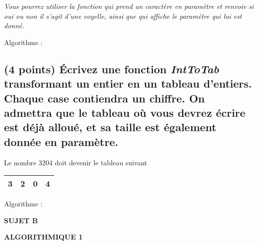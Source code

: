 \documentclass[11pt,a4paper]{article}
\newcommand{\TitreMatiere}{Algorithmique 1}
\begin{document}

\noindent \textit{Vous pourrez utiliser la fonction  qui prend un caractère en paramètre et renvoie si oui ou non il s'agit d'une voyelle, ainsi que  qui affiche le paramètre qui lui est donné.}

\begin{center}
Algorithme :
\end{center}


\clearpage


\subsection{(4 points) \'Ecrivez une fonction \og \textit{IntToTab} \fg{} transformant un entier en un tableau d'entiers. Chaque case contiendra un chiffre. On admettra que le tableau où vous devrez écrire est déjà alloué, et sa taille est également donnée en paramètre. }


\begin{center}
  Le nombre $ 3204 $ doit devenir le tableau suivant

  \smallskip

  \begin{tabular}{| c | c | c | c |}
    \hline
    3 & 2 & 0 & 4 \\
    \hline
  \end{tabular}
\end{center}


\begin{center}
Algorithme :
\end{center}


\clearpage




\vfillFirst

\begin{center}

\begin{LARGE}
\textbf{SUJET B}

\bigskip

\textbf{\MakeUppercase{\TitreMatiere}}
\end{LARGE}

\end{center}

\vfillLast
\end{document}
